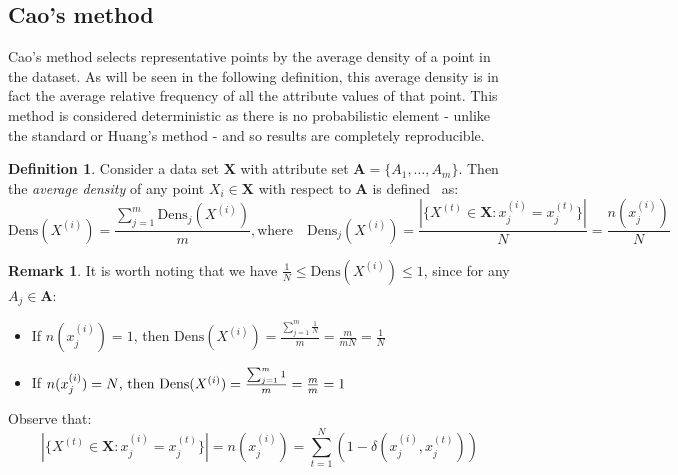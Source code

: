 \documentclass{article}
\theoremstyle{definition}
\newtheorem{definition}{Definition}[section]
\newtheorem*{remark}{Remark}
\begin{document}
\subsection{Cao's method}\label{subsection:cao}

Cao's method selects representative points by the average density of a point in
the dataset. As will be seen in the following definition, this average density 
is in fact the average relative frequency of all the attribute values of that 
point. This method is considered deterministic as there is no probabilistic 
element - unlike the standard or Huang's method - and so results are completely
reproducible.


\begin{definition}\label{def:density}	
    Consider a data set \(\textbf{X}\) with attribute set \(\textbf{A} = 
    \{A_1, \ldots, A_m\}\). Then the \emph{average density} of any point 
    \(X_i \in \textbf{X}\) with respect to \(\textbf{A}\) is 
    defined~\cite{Cao09} as:
	\[
	    \text{Dens}(X^{(i)}) = \frac{\sum_{j=1}^m \text{Dens}_{j}(X^{(i)})}{m}, 
        \text{where} \quad \text{Dens}_{j}(X^{(i)}) = \frac{|\{X^{(t)} \in 
        \textbf{X} : x_j^{(i)} = x_j^{(t)}\}|}{N} = \frac{n(x_j^{(i)})}{N}
	\]
\end{definition}

\begin{remark}
    It is worth noting that we have \(\frac{1}{N} \leq \text{Dens}(X^{(i)})
    \leq 1\), since for any \(A_j \in \textbf{A}\):		
	\begin{itemize}	
        \item If \(n(x_j^{(i)}) = 1\), then \(\text{Dens}(X^{(i)}) = 
			\frac{\sum_{j=1}^m \frac{1}{N}}{m} = \frac{m}{mN} = \frac{1}{N}\)
        \item If \(n(x_j^{(i)}) = N$, then $\text{Dens}(X^{(i)}) = 
            \frac{\sum_{j=1}^m 1}{m} = \frac{m}{m} = 1\)
	\end{itemize}
\end{remark}
    
Observe that:
\[
	|\{X^{(t)} \in \textbf{X} : x_j^{(i)} = x_j^{(t)}\}| = n(x_j^{(i)}) = 
	\sum_{t=1}^N (1 - \delta(x_j^{(i)}, x_j^{(t)}))
\]\\
\end{document}
